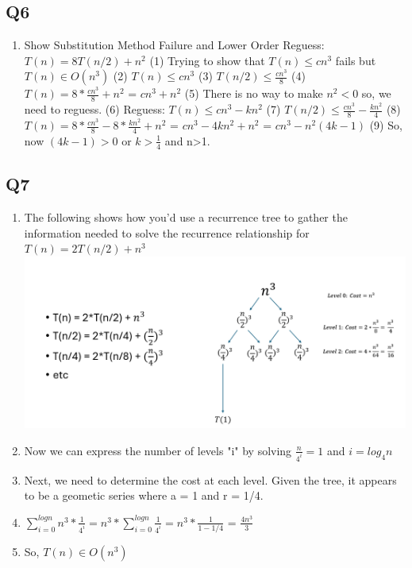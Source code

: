 \documentclass{article}
\begin{document}
\subsection*{Q6}
\begin{enumerate}[label=(\alph*)]
    \item Show Substitution Method Failure and Lower Order Reguess: $T(n) = 8T(n/2) + n^2$
    \subitem (1) Trying to show that $T(n) \leq cn^3$ fails but $T(n) \in O(n^3)$
    \subitem (2) $T(n) \leq cn^3$
    \subitem (3) $T(n/2) \leq \frac{cn^3}{8}$
    \subitem (4) $T(n) = 8*\frac{cn^3}{8} + n^2$ = $cn^3 + n^2$
    \subitem (5) There is no way to make $n^2 < 0$ so, we need to reguess.
    \subitem (6) Reguess: $T(n) \leq cn^3 - kn^2$
    \subitem (7) $T(n/2) \leq \frac{cn^3}{8} - \frac{kn^2}{4}$
    \subitem (8) $T(n) = 8*\frac{cn^3}{8} - 8*\frac{kn^2}{4} + n^2$ = $cn^3 - 4kn^2 + n^2$ = $cn^3 - n^2(4k - 1)$
    \subitem (9) So, now $(4k-1) > 0$ or $k > \frac{1}{4}$ and n>1.
    

    
    
\end{enumerate}

\subsection*{Q7}
\begin{enumerate}[label=(\alph*)]
    \item The following shows how you'd use a recurrence tree to gather the information needed to solve the recurrence relationship for $T(n) = 2T(n/2) + n^3$
    \subitem \includegraphics[width=1\textwidth]{tree.png}
    \item Now we can express the number of levels "i" by solving $\frac{n}{4^i} = 1$ and $i = log_{4}n$
    \item Next, we need to determine the cost at each level. Given the tree, it appears to be a geometic series where a = 1 and r = 1/4.
    \item $\sum\limits_{i = 0}^{logn} {n^3 * \frac{1}{4^i}} = n^3 * \sum\limits_{i = 0}^{logn} {\frac{1}{4^i}} = n^3 * \frac{1}{{1 - 1/4}}$ = $\frac{4n^3}{3}$
    \item So, $T(n) \in O(n^3)$
\end{enumerate}
\end{document}

